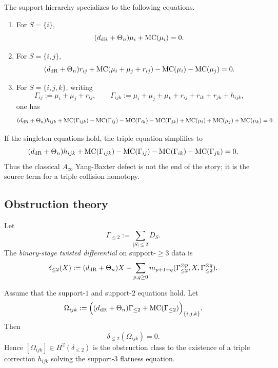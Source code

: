 \begin{corollary}%
The support hierarchy specializes to the following equations.
\begin{enumerate}[label=\textup{(\roman*)}]
 \item For $S=\{i\}$,
 \[
 (d_{\mathrm{dR}}+\Theta_n)\mu_i + \mathrm{MC}(\mu_i)=0.
 \]
 \item For $S=\{i,j\}$,
 \[
 (d_{\mathrm{dR}}+\Theta_n)r_{ij} + \mathrm{MC}(\mu_i+\mu_j+r_{ij}) - \mathrm{MC}(\mu_i)-\mathrm{MC}(\mu_j)=0.
 \]
 \item For $S=\{i,j,k\}$, writing
 \[
 \Gamma_{ij}:=\mu_i+\mu_j+r_{ij},
 \qquad
 \Gamma_{ijk}:=\mu_i+\mu_j+\mu_k+r_{ij}+r_{ik}+r_{jk}+h_{ijk},
 \]
 one has
 \[
 (d_{\mathrm{dR}}+\Theta_n)h_{ijk} + \mathrm{MC}(\Gamma_{ijk})-\mathrm{MC}(\Gamma_{ij})-\mathrm{MC}(\Gamma_{ik})-\mathrm{MC}(\Gamma_{jk})+\mathrm{MC}(\mu_i)+\mathrm{MC}(\mu_j)+\mathrm{MC}(\mu_k)=0.
 \]
\end{enumerate}
\end{corollary}

If the singleton equations hold, the triple equation simplifies to
\[
 (d_{\mathrm{dR}}+\Theta_n)h_{ijk} + \mathrm{MC}(\Gamma_{ijk})-\mathrm{MC}(\Gamma_{ij})-\mathrm{MC}(\Gamma_{ik})-\mathrm{MC}(\Gamma_{jk})=0.
\]
Thus the classical $A_\infty$ Yang-Baxter defect is not the end of the story; it is the source term for a triple collision homotopy.

\subsection{Obstruction theory}

\begin{definition}
Let
\[
 \Gamma_{\le 2}:=\sum_{|S|\le 2}D_S.
\]
The \emph{binary-stage twisted differential} on support-$\ge 3$ data is
\[
 \delta_{\le 2}(X)
 :=
 (d_{\mathrm{dR}}+\Theta_n)X + \sum_{p,q\ge 0} m_{p+1+q}(\Gamma_{\le 2}^{\otimes p},X,\Gamma_{\le 2}^{\otimes q}).
\]
\end{definition}

\begin{theorem}%
Assume that the support-$1$ and support-$2$ equations hold. Let
\[
 \Omega_{ijk}:=\Big((d_{\mathrm{dR}}+\Theta_n)\Gamma_{\le 2}+\mathrm{MC}(\Gamma_{\le 2})\Big)_{\{i,j,k\}}.
\]
Then
\[
 \delta_{\le 2}(\Omega_{ijk})=0.
\]
Hence $[\Omega_{ijk}]\in H^2(\delta_{\le 2})$ is the obstruction class to the existence of a triple correction $h_{ijk}$ solving the support-$3$ flatness equation.
\end{theorem}


